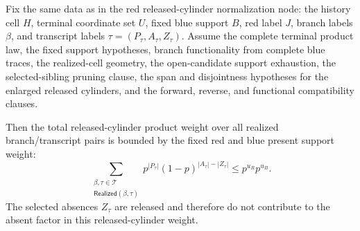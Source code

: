 \begin{helper}
Fix the same data as in the red released-cylinder normalization node:
the history cell \(H\), terminal coordinate set \(U\), fixed blue support
\(B\), red label \(J\), branch labels \(\beta\), and transcript labels
\(\tau=(P_\tau,A_\tau,Z_\tau)\).  Assume the complete terminal product law,
the fixed support hypotheses, branch functionality from complete blue traces,
the realized-cell geometry, the open-candidate support exhaustion, the
selected-sibling pruning clause, the span and disjointness hypotheses for the
enlarged released cylinders, and the forward, reverse, and functional
compatibility clauses.

Then the total released-cylinder product weight over all realized
branch/transcript pairs is bounded by the fixed red and blue present support
weight:
\[
\sum_{\substack{\beta,\tau\in\mathcal T\\ \mathsf{Realized}(\beta,\tau)}}
  p^{|P_\tau|}(1-p)^{|A_\tau|-|Z_\tau|}
\le p^{u_R}p^{u_B}.
\]
The selected absences \(Z_\tau\) are released and therefore do not contribute
to the absent factor in this released-cylinder weight.
\end{helper}
